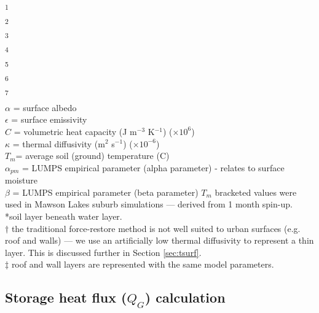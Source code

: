 \documentclass[journal abbreviation, manuscript]{copernicus}
\begin{document}
\begin{table}
\begin{center}
\begin{tabular}{  p{2.5cm} p{1.3cm} p{1.3cm} p{1.3cm} p{1.3cm} p{1.3cm} p{1.3cm} p{1.3cm} p{1.3cm} p{1.3cm}}
\hline
  \end{tabular}
  \end{center}
\footnotesize{\textsuperscript{1} \cite{Oke1987z}\\}
\footnotesize{\textsuperscript{2} \cite{stewart2014evaluation}\\}
\footnotesize{\textsuperscript{3} \cite{Jarvi2014a} \\}
\footnotesize{\textsuperscript{4} \cite{Narita1984} \\ }
\footnotesize{\textsuperscript{5} \cite{Asaeda1993}  \\}
\footnotesize{\textsuperscript{6} \cite{Grimmond1993}\\}
\footnotesize{\textsuperscript{7} \cite{Doll1985}\\}
\footnotesize{\ensuremath{\alpha} = surface albedo \\}
\footnotesize{\ensuremath{\epsilon} = surface emissivity \\}
\footnotesize{\ensuremath{C} = volumetric heat capacity (J m$^{-3}$ K$^{-1}$) ($\times10^{6}$) \\ }
\footnotesize{\ensuremath{\kappa} = thermal diffusivity (m$^{2}$ s$^{-1}$) ($\times10^{-6}$) \\}
\footnotesize{\ensuremath{T_{m}}= average soil (ground) temperature (\degree C)\\}
\footnotesize{\ensuremath{\alpha_{pm}} = LUMPS empirical parameter (alpha parameter) - relates to surface moisture \\}
\footnotesize{\ensuremath{\beta} = LUMPS empirical parameter (beta parameter)}
\footnotesize{\ensuremath{T_{m}} bracketed values were used in Mawson Lakes suburb simulations --- derived from 1 month spin-up.}\\
\footnotesize{*soil layer beneath water layer.} \\
\footnotesize{$\dagger$ the traditional force-restore method is not well suited to urban surfaces (e.g. roof and walls)  --- we use an artificially low thermal diffusivity to represent a thin layer. This is discussed further in Section \ref{sec:tsurf}.} \\
$\ddagger$ roof and wall layers are represented with the same model parameters. 
\end{table} 

\subsection{Storage heat flux ($Q_{G}$) calculation}\label{sec:lumps}
\end{document}
